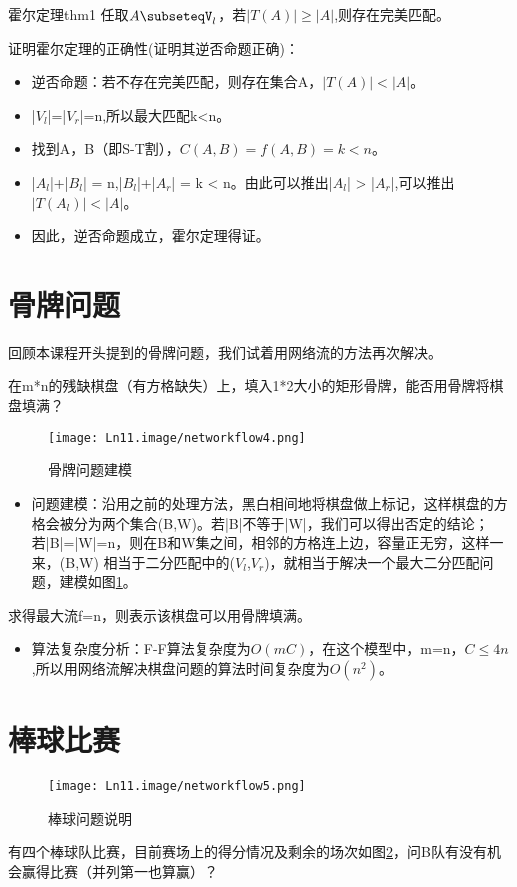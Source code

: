 \begin{theorem}{霍尔定理}{thm1}
  任取\(A\subseteqV_l\)，若\(|T(A)| \ge |A|\),则存在完美匹配。
\end{theorem}
证明霍尔定理的正确性(证明其逆否命题正确)：
\begin{itemize}
  \item 逆否命题：若不存在完美匹配，则存在集合A，\(|T(A)| < |A|\)。
  \item |\(V_l\)|=|\(V_r\)|=n,所以最大匹配k<n。
  \item 找到A，B（即S-T割），\(C(A,B) = f(A,B) = k<n\)。
  \item |\(A_l\)|+|\(B_l\)| = n,|\(B_l\)|+|\(A_r\)| = k < n。由此可以推出|\(A_l\)| > |\(A_r\)|,可以推出\(|T(A_l)| < |A|\)。
  \item 因此，逆否命题成立，霍尔定理得证。
\end{itemize}

\section{骨牌问题}
回顾本课程开头提到的骨牌问题，我们试着用网络流的方法再次解决。
\begin{example}
    在m*n的残缺棋盘（有方格缺失）上，填入1*2大小的矩形骨牌，能否用骨牌将棋盘填满？
\end{example}

\begin{figure}[htb]
  \centering
  \texttt{[image: Ln11.image/networkflow4.png]}
  \caption{骨牌问题建模}\label{fig4}
\end{figure}

\begin{itemize}
  \item 问题建模：沿用之前的处理方法，黑白相间地将棋盘做上标记，这样棋盘的方格会被分为两个集合(B,W)。若|B|不等于|W|，我们可以得出否定的结论；若|B|=|W|=n，则在B和W集之间，相邻的方格连上边，容量正无穷，这样一来，(B,W) 相当于二分匹配中的(\(V_l\),\(V_r\))，就相当于解决一个最大二分匹配问题，建模如图\ref{fig4}。
\end{itemize}

求得最大流f=n，则表示该棋盘可以用骨牌填满。
\begin{itemize}
 \item 算法复杂度分析：F-F算法复杂度为\(O(mC)\)，在这个模型中，m=n，\(C \le 4n\),所以用网络流解决棋盘问题的算法时间复杂度为\(O(n^2)\)。
\end{itemize}

\section{棒球比赛}
\begin{figure}[htb]
  \centering
  \texttt{[image: Ln11.image/networkflow5.png]}
  \caption{棒球问题说明}\label{fig5}
\end{figure}
\begin{example}
有四个棒球队比赛，目前赛场上的得分情况及剩余的场次如图\ref{fig5}，问B队有没有机会赢得比赛（并列第一也算赢）？
\end{example}

